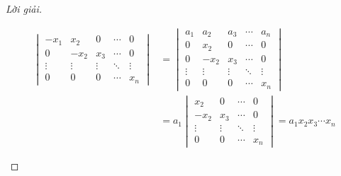 \documentclass[class=linear-algebra,crop=false]{standalone}
\begin{document}
\begin{proof}[Lời giải]
\begin{enumerate}[label = (\alph*)]
\begin{align*}
\begin{vmatrix}
				      -x_{1} & x_{2}  & 0      & \cdots & 0      \\
				      0      & -x_{2} & x_{3}  & \cdots & 0      \\
				      \vdots & \vdots & \vdots & \ddots & \vdots \\
				      0      & 0      & 0      & \cdots & x_{n}
			      \end{vmatrix}
			       & =
			      \begin{vmatrix}
				      a_{1}  & a_{2}  & a_{3}  & \cdots & a_{n}  \\
				      0      & x_{2}  & 0      & \cdots & 0      \\
				      0      & -x_{2} & x_{3}  & \cdots & 0      \\
				      \vdots & \vdots & \vdots & \ddots & \vdots \\
				      0      & 0      & 0      & \cdots & x_{n}
			      \end{vmatrix}             \\
			       & = a_{1} \begin{vmatrix}
				                 x_{2}  & 0      & \cdots & 0      \\
				                 -x_{2} & x_{3}  & \cdots & 0      \\
				                 \vdots & \vdots & \ddots & \vdots \\
				                 0      & 0      & \cdots & x_{n}
			                 \end{vmatrix} = a_{1}x_{2}x_{3}\cdots x_{n}
		      \end{align*}


\end{enumerate}
\end{proof}
\end{document}
